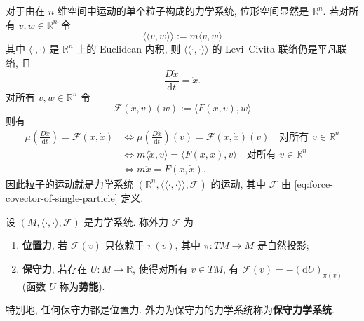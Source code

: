 \begin{RiemannExample}\label{ex:mechanical-system-for-single-particle}
对于由在 $n$ 维空间中运动的单个粒子构成的力学系统, 位形空间显然是 $\mathbb{R}^n$. 若对所有 $v,w\in\mathbb{R}^n$ 令
\[
  \langle\!\langle v,w\rangle\!\rangle:=m\langle v,w\rangle
\]
其中 $\langle\cdot,\cdot\rangle$ 是 $\mathbb{R}^n$ 上的 Euclidean 内积, 则 $\langle\!\langle\cdot,\cdot\rangle\!\rangle$ 的 Levi–Civita 联络仍是平凡联络, 且
\[
  \frac{D\dot x}{\mathrm{d}t}=\ddot x.
\]
对所有 $v,w\in\mathbb{R}^n$ 令
\begin{equation}\label{eq:force-covector-of-single-particle}
  \mathcal{F}(x,v)(w):=\langle F(x,v),w\rangle
\end{equation}
则有
\begin{align*}
  \mu\left(\frac{D\dot x}{\mathrm{d}t}\right)=\mathcal{F}(x,\dot x)
  &\Leftrightarrow \mu\left(\frac{D\dot x}{\mathrm{d}t}\right)(v)=\mathcal{F}(x,\dot x)(v)
    \quad\text{对所有 }v\in\mathbb{R}^n\\
  &\Leftrightarrow m\langle\ddot x,v\rangle=\langle F(x,\dot x),v\rangle
    \quad\text{对所有 }v\in\mathbb{R}^n\\
  &\Leftrightarrow m\ddot x=F(x,\dot x).
\end{align*}
因此粒子的运动就是力学系统 $(\mathbb{R}^n,\langle\!\langle\cdot,\cdot\rangle\!\rangle,\mathcal{F})$ 的运动, 其中 $\mathcal{F}$ 由 \eqref{eq:force-covector-of-single-particle} 定义.
\end{RiemannExample}

\begin{RiemannDefinition}\label{def:positional-and-conservative-external-force}
设 $(M,\langle\cdot,\cdot\rangle,\mathcal{F})$ 是力学系统. 称外力 $\mathcal{F}$ 为
\begin{enumerate}[label=(\roman*),leftmargin=*]
\item \textbf{位置力}, 若 $\mathcal{F}(v)$ 只依赖于 $\pi(v)$, 其中 $\pi:TM\to M$ 是自然投影;
\item \textbf{保守力}, 若存在 $U:M\to\mathbb{R}$, 使得对所有 $v\in TM$, 有 $\mathcal{F}(v)=-(\mathrm{d}U)_{\pi(v)}$ (函数 $U$ 称为\textbf{势能}).
\end{enumerate}
\end{RiemannDefinition}

\begin{RiemannRemark}\label{rem:conservative-mechanical-system}
特别地, 任何保守力都是位置力. 外力为保守力的力学系统称为\textbf{保守力学系统}.
\end{RiemannRemark}

